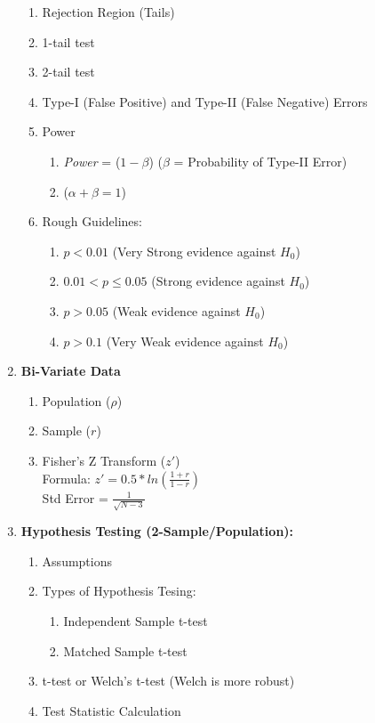 \documentclass[11pt]{article}
\begin{document}
\begin{enumerate}
\begin{enumerate}
			\item Rejection Region (Tails)
			\item 1-tail test
			\item 2-tail test
			\item Type-I (False Positive) and Type-II (False Negative) Errors
			\item Power
			\begin{enumerate}
				\item \textit{Power} = ($1 - \beta$) ($\beta$ = Probability of Type-II Error)
				\item ($\alpha + \beta = 1$) 
			\end{enumerate}
			\item Rough Guidelines:
			\begin{enumerate}
				\item $p < 0.01$ (Very Strong evidence against $H_0$)
				\item $0.01 < p \leq 0.05$ (Strong evidence against $H_0$)
				\item $p > 0.05$ (Weak evidence against $H_0$)
				\item $p > 0.1$ (Very Weak evidence against $H_0$)
			\end{enumerate}
		\end{enumerate} 
		\item \textbf{Bi-Variate Data}
		\begin{enumerate}
			\item Population ($\rho$)
			\item Sample ($r$)
			\item Fisher's Z Transform ($z'$) \\
			Formula:
			$z' = 0.5 * ln(\frac{1 + r}{1 - r})  $ \\
			Std Error = $\frac{1}{\sqrt{N - 3}}$
		\end{enumerate}
		\item \textbf{Hypothesis Testing (2-Sample/Population):}
		\begin{enumerate}
			\item Assumptions
			\item Types of Hypothesis Tesing:
			\begin{enumerate}
				\item Independent Sample t-test
				\item Matched Sample t-test
			\end{enumerate}
			\item t-test or Welch's t-test (Welch is more robust)
			\item Test Statistic Calculation

\end{enumerate}
\end{enumerate}
\end{document}
